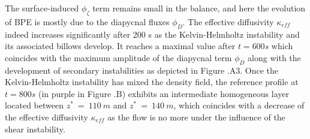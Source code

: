 The surface-induced $\phi_{\zeta}$ term remains small in the balance, and here the evolution of BPE is mostly due to the diapycnal fluxes $\phi_D$. The effective diffusivity $\kappa_{eff}$ indeed increases significantly after 200 s as the Kelvin-Helmholtz instability and its associated billows develop. It reaches a maximal value after $t=600 s$ which coincides with the maximum amplitude of the diapycnal term $\phi_D$ along with the development of secondary instabilities as depicted in Figure .A3.
Once the Kelvin-Helmholtz instability has mixed the density field, the reference profile at $t=800s$ (in purple in Figure .B) exhibits an intermediate homogeneous layer located between $z^*\ =\ 110\ m$ and $z^*\ =\ 140\ m$, which coincides with a decrease of the effective diffusivity $\kappa_{eff}$ \color{red}as the flow is no more under the influence of the shear instability\color{black}.


